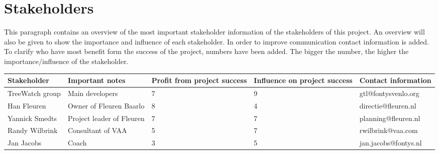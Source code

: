 \section{Stakeholders}

This paragraph contains an overview of the most important stakeholder information of the stakeholders of this project. An overview will also be given to show the importance and influence of each stakeholder. In order to improve communication contact information is added. To clarify who have most benefit form the success of the project, numbers have been added. The bigger the number, the higher the importance/influence of the stakeholder.

\begin{tabular}{| p{} | p{3cm} | p{} | p{} | p{} |}
	\hline
	Stakeholder & Important notes & Profit from project success & Influence on project success & Contact information \\
	\hline
	TreeWatch group & Main developers & 7 & 9 & gtl@fontysvenlo.org \\
	\hline
	Han Fleuren & Owner of Fleuren Baarlo & 8 & 4 & directie@fleuren.nl \\
	\hline
	Yannick Smedts & Project leader of Fleuren & 7 & 7 & planning@fleuren.nl \\
	\hline
	Randy Wilbrink & Consultant of VAA & 5 & 7 & rwilbrink@vaa.com \\
	\hline
	Jan Jacobs & Coach & 3 & 5 & jan.jacobs@fontys.nl \\
	\hline
\end{tabular}